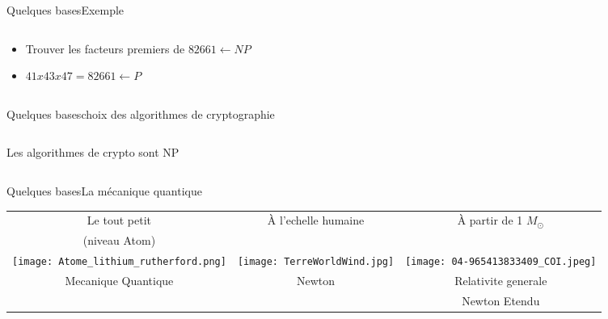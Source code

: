 \documentclass{beamer}
\begin{document}
\begin{frame}{Quelques bases}{Exemple}
  \begin{columns}
    \begin{column}{0.5\textwidth}
      \begin{itemize}
      \item Trouver les facteurs premiers de $82661 \leftarrow NP$
      \item $41x43x47 = 82661 \leftarrow P$
      \end{itemize}
    \end{column}
    
    \begin{column}{0.5\textwidth}
    \end{column}
  \end{columns}
\end{frame}

\begin{frame}{Quelques bases}{choix des algorithmes de cryptographie}
  \begin{columns}
    \begin{column}{0.5\textwidth}
      Les algorithmes de crypto sont NP
    \end{column}
    
    \begin{column}{0.5\textwidth}
    \end{column}
  \end{columns}
\end{frame}

\begin{frame}{Quelques bases}{La m\'{e}canique quantique}
  \begin{center}
    \begin{tabular}{ c c c }
      Le tout petit & \`{A} l'echelle humaine  & \`{A} partir de 1 \(M_\odot\) \\
      (niveau Atom) & & \\
      \texttt{[image: Atome\_lithium\_rutherford.png]} & \texttt{[image: TerreWorldWind.jpg]} & \texttt{[image: 04-965413833409\_COI.jpeg]}\\
      Mecanique Quantique & Newton & Relativite generale \\
       &  & Newton Etendu \\
    \end{tabular}
  \end{center}
\end{frame}
\end{document}
